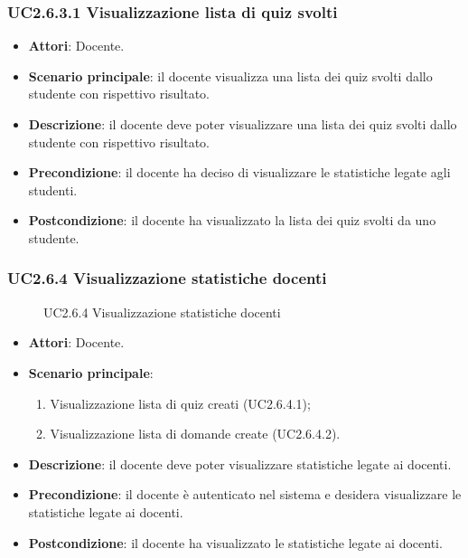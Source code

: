\subsubsection{UC2.6.3.1 Visualizzazione lista di quiz svolti}
\begin{itemize}
\item \textbf{Attori}: Docente.
\item \textbf{Scenario principale}: il docente visualizza una lista dei quiz svolti dallo studente con rispettivo risultato.
\item \textbf{Descrizione}: il docente deve poter visualizzare una lista dei quiz svolti dallo studente con rispettivo risultato.
\item \textbf{Precondizione}: il docente ha deciso di visualizzare le statistiche legate agli studenti.
\item \textbf{Postcondizione}: il docente ha visualizzato la lista dei quiz svolti da uno studente.
\end{itemize}
\subsubsection{UC2.6.4 Visualizzazione statistiche docenti}
\begin{figure}[H]
\centering
\noindent{}
\caption{UC2.6.4 Visualizzazione statistiche docenti}
\end{figure}
\begin{itemize}
\item \textbf{Attori}: Docente.
\item \textbf{Scenario principale}:
\begin{enumerate}
\item Visualizzazione lista di quiz creati (UC2.6.4.1);
\item Visualizzazione lista di domande create (UC2.6.4.2).
\end{enumerate}
\item \textbf{Descrizione}: il docente deve poter visualizzare statistiche legate ai docenti.
\item \textbf{Precondizione}: il docente è autenticato nel sistema e desidera visualizzare le statistiche legate ai docenti.
\item \textbf{Postcondizione}: il docente ha visualizzato le statistiche legate ai docenti.
\end{itemize}
